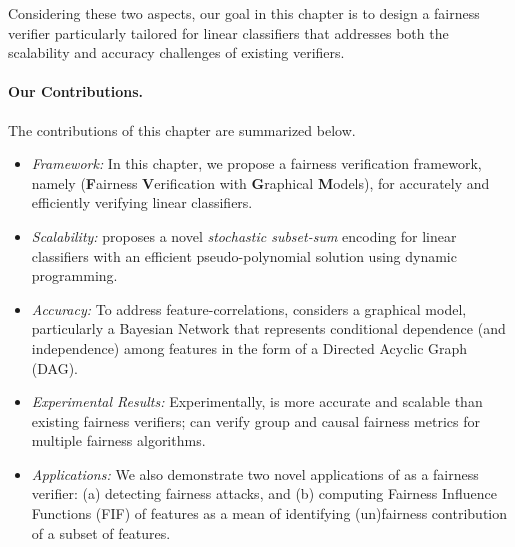 	Considering these two aspects, our goal in this chapter is to design a fairness verifier particularly tailored for linear classifiers that addresses both the scalability and accuracy challenges of existing verifiers.
	
		
	
	\paragraph{Our Contributions.} The contributions of this chapter are summarized below.
	
	\begin{itemize}
		\item \textit{Framework:} In this chapter, we propose a fairness verification framework, namely {\fvgm} (\textbf{F}airness \textbf{V}erification with \textbf{G}raphical \textbf{M}odels), for accurately and efficiently verifying linear classifiers.
		\item \textit{Scalability:} {\fvgm} proposes a novel \textit{stochastic subset-sum} encoding for linear classifiers with an efficient pseudo-polynomial solution using dynamic programming.
		\item \textit{Accuracy:} To address feature-correlations, {\fvgm} considers a graphical model, particularly a Bayesian Network that represents conditional dependence (and independence) among features in the form of a Directed Acyclic Graph (DAG). 
		\item \textit{Experimental Results:}	Experimentally,  {\fvgm} is more accurate and scalable than existing fairness verifiers; {\fvgm} can verify group and causal fairness metrics for multiple fairness algorithms.
		\item \textit{Applications:} We also demonstrate two novel applications of {\fvgm} as a fairness verifier: (a) detecting fairness attacks, and (b) computing Fairness Influence Functions (FIF) of features as a mean of identifying (un)fairness contribution of a subset of features. 
	\end{itemize}
 



